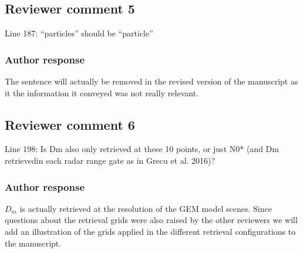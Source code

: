 \documentclass[11pt]{scrartcl}
\providecommand{\DIFadd}[1]{{\protect\textcolor{blue}{\uwave{#1}}}} %
\providecommand{\DIFdel}[1]{{\protect\textcolor{red}{\sout{#1}}}}                      %
\providecommand{\DIFaddbegin}{} %
\providecommand{\DIFaddend}{} %
\providecommand{\DIFdelbegin}{} %
\providecommand{\DIFaddFL}[1]{\DIFadd{#1}} %
\newenvironment{change}[1][]{%
  \begin{mdframed}[frametitle={Line #1:}]%
}{%
  \end{mdframed}%
}
\begin{document}

\subsection*{Reviewer comment 5}
Line 187: “particles” should be “particle”

\subsubsection*{Author response}

The sentence will actually be removed in the revised version of the manuscript as it
the information it conveyed was not really relevant.



\subsection{Reviewer comment 6}
Line 198: Is Dm also only retrieved at these 10 points, or just N0* (and Dm retrievedin each radar range gate as in Grecu et al. 2016)?

\subsubsection*{Author response}

$D_m$ is actually retrieved at the resolution of the GEM model scenes. Since
questions about the retrieval grids were also raised by the other reviewers we
will add an illustration of the grids applied in the different retrieval
configurations to the manuscript.


\end{document}
